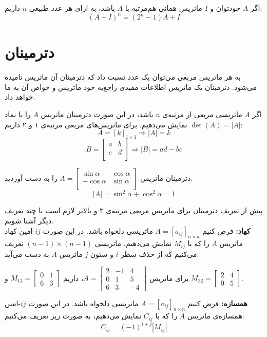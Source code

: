 \begin{theorem}
	اگر $A$ خودتوان و $I$ ماتریس همانی هم‌مرتبه با $A$ باشد، به ازای هر عدد طبیعی $n$ داریم:
	$$(A+I)^n = (2^n-1)A + I$$
\end{theorem}

\section{دترمینان}
به هر ماتریس مربعی می‌توان یک عدد نسبت داد که دترمینان آن ماتریس نامیده می‌شود. دترمینان یک ماتریس اطلاعات مفیدی راجع‌به خود ماتریس و خواص آن به ما خواهد داد.

اگر $A$ ماتریسی مربعی از مرتبه‌ی $n$ باشد، در این صورت دترمینان ماتریس $A$ را با نماد
$\det(A)=|A|$
نمایش می‌دهیم. برای ماتریس‌های مربعی مرتبه‌ی ۱ و ۲ داریم:
\[
A=[k]_{1 \times 1} \Rightarrow |A|=k
\]
\[
B=
\begin{bmatrix}
	a & b \\
	c & d \\	
\end{bmatrix}
\Rightarrow
|B|=ad-bc
\]

\begin{example}
	دترمینان ماتریس
	$A=\begin{bmatrix}
		\sin\alpha & \cos\alpha \\
		-\cos\alpha & \sin\alpha \\	
	\end{bmatrix}$
	را به دست آوردید.
	\[
	|A|=\sin^2\alpha + \cos^2\alpha = 1
	\]
\end{example}
\smallskip
پیش از تعریف دترمینان برای ماتریس مربعی مرتبه‌ی ۳ و بالاتر لازم است با چند تعریف دیگر آشنا شویم.
\\
\textbf{کهاد:}
فرض کنیم
$A=[a_{ij}]_{n \times n}$
ماتریسی دلخواه باشد. در این صورت $ij$-امین کهاد ماتریس $A$ را که با
$M_{ij}$
نمایش می‌دهیم، ماتریسی
$(n-1) \times (n-1)$
تعریف می‌کنیم که از حذف سطر $i$ و ستون $j$ ماتریس $A$ به دست می‌آید.

\begin{example}
	برای ماتریس
	$A=
	\begin{bmatrix}
		2 & -1 & 4 \\
		0 & 1 & 5 \\
		6 & 3 & -4
	\end{bmatrix}$،
	داریم
	$M_{13}=
	\begin{bmatrix}
		0 & 1 \\
		6 & 3
	\end{bmatrix}$
	و
	$M_{32}=
	\begin{bmatrix}
		2 & 4 \\
		0 & 5
	\end{bmatrix}$.
\end{example}
\smallskip
\textbf{همسازه:}
فرض کنیم
$A=[a_{ij}]_{n \times n}$
ماتریسی دلخواه باشد. در این صورت $ij$-امین همسازه‌ی ماتریس $A$ را که با
$C_{ij}$
نمایش می‌دهیم، به صورت زیر تعریف می‌کنیم:
$$C_{ij} = (-1)^{i+j} \left|M_{ij}\right|$$

